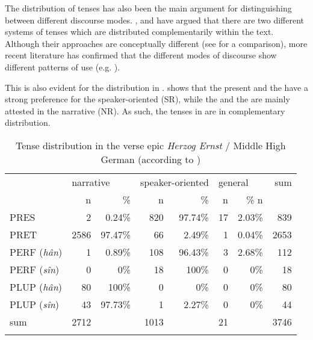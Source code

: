 \documentclass[output=paper,colorlinks,citecolor=brown]{langscibook}
\begin{document}
The distribution of tenses has also been the main argument for distinguishing between different discourse modes. \citet{benviste1972}, \citet{Weinrich1964} and \citet{Hamburger1957} have argued that there are two different systems of tenses which are distributed complementarily within the text. Although their approaches are conceptually different (see \citealt{Fludernik2012} for a comparison), more recent literature has confirmed that the different modes of discourse show different patterns of  use (e.g. \citealt{Smith2003}). 

This is also evident for the  distribution in  \citep{Zeman2010}.  shows that the present and the  have a strong preference for the speaker-oriented  (SR), while the  and the  are mainly attested in the narrative  (NR). As such, the tenses in  are in complementary distribution.

\begin{table}
\caption{Tense distribution in the verse epic \textit{Herzog Ernst} / Middle High German (according to \citealt[117]{Zeman2010})}
\label{tab:zeman:3}
\begin{tabularx}{0.9\textwidth}{Xrrrrrrr}
\lsptoprule
& \multicolumn{2}{l}{narrative} & \multicolumn{2}{l}{speaker-oriented} & \multicolumn{2}{l}{general} & sum\\
& n & \% & n & \% & n & \% n\\
\midrule
PRES & 2 & 0.24\% & 820 & 97.74\% & 17 & 2.03\% & 839\\
PRET & 2586& 97.47\% & 66 & 2.49\% & 1 & 0.04\% & 2653\\
PERF (\textit{hân}) & 1& 0.89\% & 108 & 96.43\% & 3 & 2.68\% & 112\\
PERF (\textit{sîn})& 0& 0\% & 18 & 100\% & 0 & 0\% & 18\\
PLUP (\textit{hân})& 80& 100\% & 0 & 0\% & 0 & 0\% & 80\\
PLUP (\textit{sîn})& 43 & 97.73\% & 1 & 2.27\% & 0 & 0\%& 44\\
\midrule
sum & 2712 && 1013&& 21 &&3746\\
\lspbottomrule
\end{tabularx}
\end{table}
\end{document}
